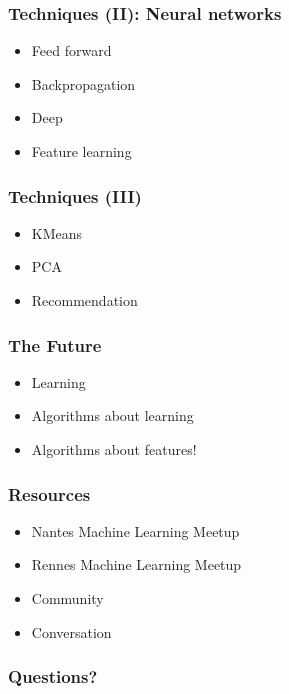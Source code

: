 \begin{frame}
  \frametitle{Techniques (II): Neural networks}

  \begin{itemize}
  \item Feed forward
  \item Backpropagation
  \item Deep
  \item Feature learning
  \end{itemize}
\end{frame}

\begin{frame}
  \frametitle{Techniques (III)}

  \begin{itemize}
  \item KMeans
  \item PCA
  \item Recommendation
  \end{itemize}
\end{frame}

\begin{frame}
  \frametitle{The Future}

  \begin{itemize}
  \item Learning
  \item Algorithms about learning
  \item Algorithms about features!
  \end{itemize}
\end{frame}

\begin{frame}
  \frametitle{Resources}

  \begin{itemize}
  \item Nantes Machine Learning Meetup
  \item Rennes Machine Learning Meetup \textit{}
  \item Community
  \item Conversation
  \end{itemize}
\end{frame}


\begin{frame}
  \frametitle{Questions?}
\end{frame}


